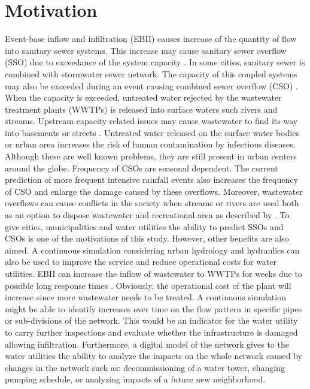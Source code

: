 \section{Motivation}
Event-base inflow and infiltration (EBII) causes increase of the quantity of flow into sanitary sewer systems. This increase may cause sanitary sewer overflow (SSO) due to exceedance of the system capacity  \cite{Rossman2016}. In some cities, sanitary sewer is combined with stormwater sewer network. The capacity of this coupled systems may also be exceeded during an event causing combined sewer overflow (CSO) \cite{Vallabhaneni2007}. When the capacity is exceeded, untreated water rejected by the wastewater treatment plants (WWTPs) is released into surface waters \cite{DeRodaHusman2016} such rivers and streams. Upstream capacity-related issues may cause wastewater to find its way into basements or streets \cite{Roesner2009}. Untreated water released on the surface water bodies or urban area increases the risk of human contamination by infectious diseases. 
Although these are well known problems, they are still present in urban centers around the globe. Frequency of CSOs are seasonal dependent. The current prediction of more frequent intensive rainfall events also increases the frequency of CSO \cite{DeRodaHusman2016} and enlarge the damage caused by these overflows. Moreover, wastewater overflows can cause conflicts in the society when streams or rivers are used both as an option to dispose wastewater and recreational area as described by \citet{heikkinen2016}. To give cities, municipalities and water utilities the ability to predict SSOs and CSOs is one of the motivations of this study. However, other benefits are also aimed. A continuous simulation considering urban hydrology and hydraulics can also be used to improve the service and reduce operational costs for water utilities. 
EBII can increase the inflow of wastewater to WWTPs for weeks due to possible long response times \cite{Mosley2001}. Obviously, the operational cost of the plant will increase since more wastewater needs to be treated. A continuous simulation might be able to identify increases over time on the flow pattern in specific pipes or sub-divisions of the network. This would be an indicator for the water utility to carry further inspections and evaluate whether the infrastructure is damaged allowing infiltration. Furthermore, a digital model of the network gives to the water utilities the ability to analyze the impacts on the whole network caused by changes in the network such as: decommissioning of a water tower, changing pumping schedule, or analyzing impacts of a future new neighborhood. 




